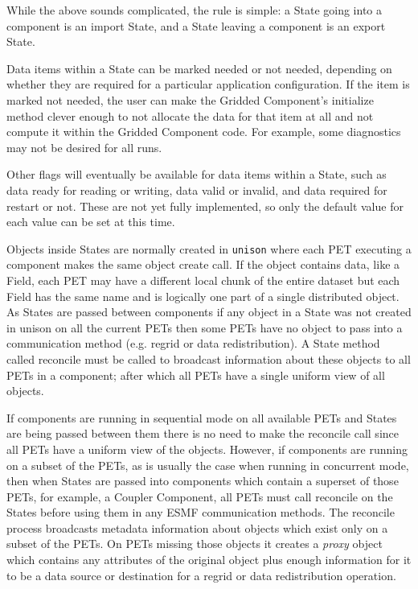 While the above sounds complicated, the rule is simple:
a State going into a component is an import State, and a 
State leaving a component is an export State.

Data items within a State can be marked needed or not needed,
depending on whether they are required for a particular 
application configuration.  If the item is marked not needed,
the user can make the Gridded Component's initialize method 
clever enough to not allocate the data for that item at all
and not compute it within the Gridded Component code.
For example, some diagnostics may not be desired for all 
runs.

Other flags will eventually be available for data items within 
a State, such as data ready for reading or writing, data valid or 
invalid, and data required for restart or not.  These are not
yet fully implemented, so only the default value for each value 
can be set at this time.

Objects inside States are normally created in {\tt unison} where
each PET executing a component makes the same object create call.
If the object contains data, like a Field, each PET may have a
different local chunk of the entire dataset but each Field has
the same name and is logically one part of a single distributed 
object.   As States are passed between components if any object
in a State was not created in unison on all the current PETs 
then some PETs have no object to pass into a
communication method (e.g. regrid or data redistribution).
A State method called reconcile must be called to broadcast 
information about these objects to all PETs in a component;
after which all PETs have a single uniform view of all objects.  

If components are running in sequential mode on all available PETs
and States are being passed between them there is no need to make
the reconcile call since all PETs have a uniform view of the objects.
However, if components are running on a subset of the PETs, as is
usually the case when running in concurrent mode, then when States
are passed into components which contain a superset of those PETs,
for example, a Coupler Component, all PETs must call reconcile
on the States before using them in any ESMF communication methods.
The reconcile process broadcasts metadata information about objects
which exist only on a subset of the PETs.  On PETs missing those
objects it creates a {\it proxy} object which contains any
attributes of the original object plus enough information for it
to be a data source or destination for a regrid or data redistribution
operation. 


